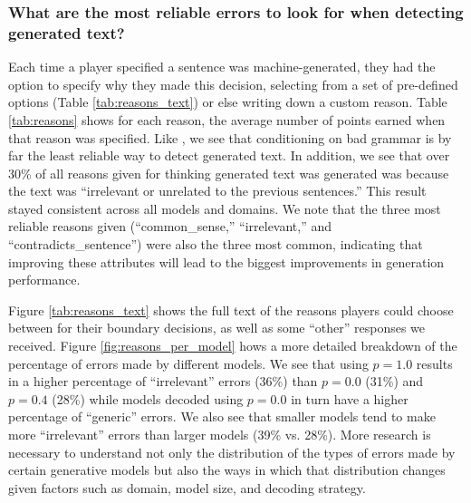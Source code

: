 \subsubsection{What are the most reliable errors to look for when detecting generated text?}
\label{sec:reasons}
Each time a player specified a sentence was machine-generated, they had the option to specify why they made this decision, selecting from a set of pre-defined options (Table \ref{tab:reasons_text}) or else writing down a custom reason.
Table \ref{tab:reasons} shows for each reason, the average number of points earned when that reason was specified.
Like \citet{clark2021all}, we see that conditioning on bad grammar is by far the least reliable way to detect generated text.
In addition, we see that over 30\% of all reasons given for thinking generated text was generated was because the text was ``irrelevant or unrelated to the previous sentences.''
This result stayed consistent across all models and domains.
We note that the three most reliable reasons given (``common\_sense,'' ``irrelevant,'' and ``contradicts\_sentence'') were also the three most common, indicating that improving these attributes will lead to the biggest improvements in generation performance.

Figure \ref{tab:reasons_text} shows the full text of the reasons players could choose between for their boundary decisions, as well as some ``other'' responses we received. 
Figure \ref{fig:reasons_per_model} hows a more detailed breakdown of the percentage of errors made by different models. We see that using $p=1.0$ results in a higher percentage of ``irrelevant'' errors (36\%) than $p=0.0$ (31\%) and $p=0.4$ (28\%) while models decoded using $p=0.0$ in turn have a higher percentage of ``generic'' errors. We also see that smaller models tend to make more ``irrelevant'' errors than larger models (39\% vs. 28\%).
More research is necessary to understand not only the distribution of the types of errors made by certain generative models but also the ways in which that distribution changes given factors such as domain, model size, and decoding strategy.

